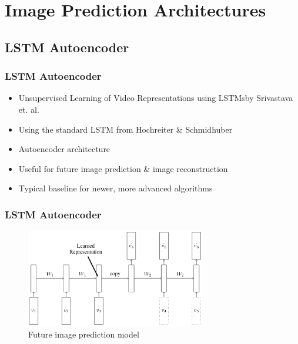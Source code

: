 \section{Image Prediction Architectures} 
 \subsection{LSTM Autoencoder}
  \begin{frame}
   \frametitle{LSTM Autoencoder}
   
   \begin{itemize}
    \item<1-> \glqq Unsupervised Learning of Video Representations using LSTMs\grqq by Srivastava et. al. \cite{Srivastava2015}
    \item<2-> Using the standard LSTM from Hochreiter \& Schmidhuber \cite{Hochreiter1997}
    \item<3-> Autoencoder architecture
    \item<4-> Useful for future image prediction \& image reconstruction
    \item<5-> Typical baseline for newer, more advanced algorithms
   \end{itemize}
   
  \end{frame}
  \begin{frame}
   \frametitle{LSTM Autoencoder}
   
   \begin{figure}[H]
    \includegraphics[width=0.7\textwidth]{../Images/srivastava.png}
    \centering
    \caption{Future image prediction model \citep{Srivastava2015}}
    \label{fig:lstm_architecture}
   \end{figure}
  
  \end{frame}
 
